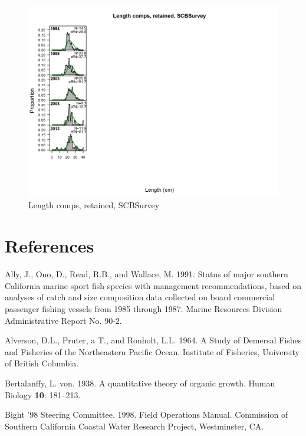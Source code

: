 \documentclass[12pt,]{article}
\begin{document}
\begin{figure}[htbp]
\centering
\includegraphics{./r4ss/plots_mod1/comp_lenfit_flt11mkt2.png}
\caption{Length comps, retained, SCBSurvey
\label{fig:mod1_12_comp_lenfit_flt11mkt2}}
\end{figure}

\newpage

\color{black}

\section*{References}\label{references}

\renewcommand{\thepage}{}

\hypertarget{refs}{}
\hypertarget{ref-Ally1991}{}
Ally, J., Ono, D., Read, R.B., and Wallace, M. 1991. Status of major
southern California marine sport fish species with management
recommendations, based on analyses of catch and size composition data
collected on board commercial passenger fishing vessels from 1985
through 1987. Marine Resources Division Administrative Report No. 90-2.

\hypertarget{ref-Alverson1964}{}
Alverson, D.L., Pruter, a T., and Ronholt, L.L. 1964. A Study of
Demersal Fishes and Fisheries of the Northeastern Pacific Ocean.
Institute of Fisheries, University of British Columbia.

\hypertarget{ref-vonB1938}{}
Bertalanffy, L. von. 1938. A quantitative theory of organic growth.
Human Biology \textbf{10}: 181--213.

\hypertarget{ref-Bight1998}{}
Bight '98 Steering Committee. 1998. Field Operations Manual. Commission
of Southern California Coastal Water Research Project, Westminster, CA.
\end{document}
